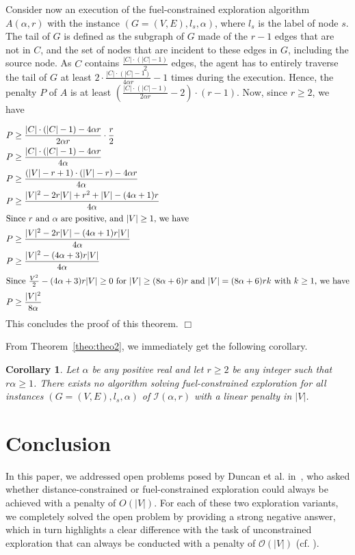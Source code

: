 \documentclass[11pt]{article}
\newtheorem{corollary}{Corollary}[section]
\newcommand{\qed}{\hfill $\Box$ \bigbreak}
\newenvironment{proof}{\noindent {\bf Proof.}}{\qed}
\begin{document}
{\begin{proof}
  Consider now an execution of the fuel-constrained exploration algorithm $A(\alpha,r)$ with the instance $(G=(V,E),l_s,\alpha)$, where $l_s$ is the label of node $s$. The tail of $G$ is defined as the subgraph of $G$ made of the $r-1$ edges that are not in $C$, and the set of nodes that are incident to these edges in $G$, including the source node.
  As $C$ contains $\frac{|C|\cdot (|C|-1)}{2}$ edges,  the agent has to entirely traverse the tail of $G$ at least $2\cdot \frac{|C|\cdot (|C|-1)}{4\alpha r}-1$ times during the execution. Hence, the penalty $P$ of $A$ is at least $\left(\frac{|C|\cdot (|C|-1)}{2\alpha r}-2\right) \cdot (r-1)$. Now, since $r \geq 2$, we have

  \begin{align*}
P & \geq \frac{|C|\cdot (|C|-1)-4\alpha r}{2\alpha r} \cdot \frac{r}{2}\\
    P & \geq \frac{|C|\cdot (|C|-1)-4\alpha r}{4\alpha}\\
    P & \geq \frac{(|V|-r+1)\cdot (|V|-r)-4\alpha r}{4\alpha}\\
    P & \geq \frac{|V|^2-2r|V|+r^2+|V|-(4\alpha+1)r}{4\alpha}\\
    \intertext{Since $r$ and $\alpha$ are positive, and $|V|\geq 1$, we have}
    P & \geq \frac{|V|^2-2r|V|-(4\alpha+1)r|V|}{4\alpha}\\
    P & \geq \frac{|V|^2-(4\alpha+3)r|V|}{4\alpha}\\
  \intertext{Since $\frac{V^2}{2}-(4\alpha+3)r|V| \geq 0$ for $|V| \geq (8\alpha+6)r$ and $|V| = (8\alpha+6)rk$ with $k \geq 1$, we have}
    P & \geq \frac{|V|^2}{8\alpha}\\
\end{align*}
This concludes the proof of this theorem.
\end{proof}

From Theorem~\ref{theo:theo2}, we immediately get the following corollary.

\begin{corollary}
\label{col:col2}
Let $\alpha$ be any positive real and let $r\geq 2$ be any integer such that $r\alpha\geq 1$. There exists no algorithm solving fuel-constrained exploration for all instances $(G=(V,E),l_s,\alpha)$ of $\mathcal{I}(\alpha,r)$ with a linear penalty in $|V|$.
\end{corollary}

\section{Conclusion}
In this paper, we addressed open problems posed by Duncan et al. in~\cite{DuncanKK06}, who asked whether distance-constrained or fuel-constrained exploration could always be achieved with a penalty of \(O(|V|)\). For each of these two exploration variants, we completely solved the open problem by providing a strong negative answer, which in turn highlights a clear difference with the task of unconstrained exploration that can always be conducted with a penalty of $\mathcal{O}(|V|)$ (cf. \cite{PanaiteP99}).

}
\end{document}
